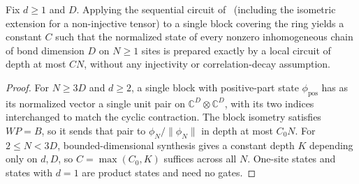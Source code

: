 \begin{lemma}
    \label{thm:ldp_inhomogeneous_exact}
    \leanok
    Fix $d\ge1$ and $D$. Applying the sequential circuit
    of~\cite{Malz2024Preparation} (including the isometric extension for a
    non-injective tensor) to a single block covering the ring yields a constant
    $C$ such that the normalized state of every nonzero inhomogeneous chain of
    bond dimension $D$ on $N\ge1$ sites is prepared exactly by a local circuit
    of depth at most $CN$, without any injectivity or correlation-decay
    assumption.
\end{lemma}
\begin{proof}
    \leanok
    For $N\ge3D$ and $d\ge2$, a single block with positive-part state
    $\phi_{\mathrm{pos}}$ has as its normalized vector a single unit pair on
    $\mathbb C^D\otimes\mathbb C^D$, with its two indices interchanged to
    match the cyclic contraction. The block isometry satisfies $WP=B$, so
    it sends that pair to $\phi_N/\lVert\phi_N\rVert$ in depth at most $C_0N$.
    For $2\le N<3D$, bounded-dimensional synthesis gives a constant depth
    $K$ depending only on $d,D$, so $C=\max(C_0,K)$ suffices across all $N$.
    One-site states and states with $d=1$ are product states and need no gates.
\end{proof}

